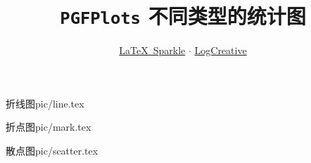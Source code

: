 \documentclass[a4paper,12pt]{article}
\title{\texttt{PGFPlots} 不同类型的统计图}
\author{\href{https://logcreative.github.io/LaTeXSparkle/index.html}{\LaTeX\ Sparkle} $\cdot$ \href{https://space.bilibili.com/31271993}{LogCreative}}
\date{}
\begin{document}
\begin{CJK}{UTF8}{song} %
    \maketitle

    \begin{graphbox}{折线图}{pic/line.tex}
    \end{graphbox}
    
    \begin{graphbox}{折点图}{pic/mark.tex}
    \end{graphbox}

    \begin{graphbox}{散点图}{pic/scatter.tex}
    \end{graphbox}

\end{CJK}
\end{document}
